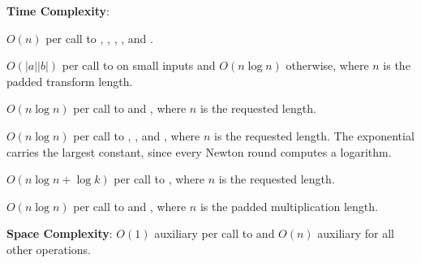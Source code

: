 \textbf{Time Complexity}:
\begin{compactitem}
  \item $O(n)$ per call to , , , , and .
  \item $O(|a||b|)$ per call to  on small inputs and $O(n \log n)$ otherwise, where $n$ is the padded transform length.
  \item $O(n \log n)$ per call to  and , where $n$ is the requested length.
  \item $O(n \log n)$ per call to , , and , where $n$ is the requested length. The exponential carries the largest constant, since every Newton round computes a logarithm.
  \item $O(n \log n + \log k)$ per call to , where $n$ is the requested length.
  \item $O(n \log n)$ per call to  and , where $n$ is the padded multiplication length.
\end{compactitem}

\textbf{Space Complexity}: $O(1)$ auxiliary per call to  and $O(n)$ auxiliary for all other operations.


